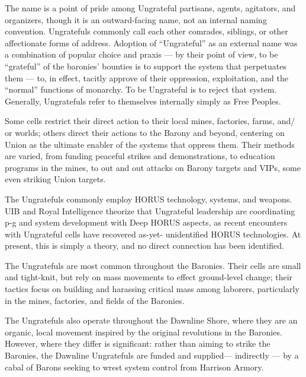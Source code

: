 The name is a point of pride among Ungrateful partisans, agents, agitators, and organizers,  
though it is an outward-facing name, not an internal naming convention. Ungratefuls commonly  
call each other comrades, siblings, or other affectionate forms of address. Adoption of  
“Ungrateful” as an external name was a combination of popular choice and praxis — by their  
point of view, to be “grateful” of the baronies’ bounties is to support the system that perpetuates  
them — to, in effect, tacitly approve of their oppression, exploitation, and the “normal” functions  
of monarchy. To be Ungrateful is to reject that system. Generally, Ungratefuls refer to themselves  
internally simply as Free Peoples. 
 

Some cells restrict their direct action to their local mines, factories, farms, and/ or worlds; others  
direct their actions to the Barony and beyond, centering on Union as the ultimate enabler of the  
systems that oppress them. Their methods are varied, from funding peaceful strikes and  
demonstrations, to education programs in the mines, to out and out attacks on Barony targets  
and VIPs, some even striking Union targets. 
 

                                                                                                          


The Ungratefuls commonly employ HORUS technology, systems, and weapons. UIB and Royal  
Intelligence theorize that Ungrateful leadership are coordinating p-g and system development  
with Deep HORUS aspects, as recent encounters with Ungrateful cells have recovered as-yet- 
unidentified HORUS technologies. At present, this is simply a theory, and no direct connection  
has been identified.  
 

The Ungratefuls are most common throughout the Baronies. Their cells are small and tight-knit,  
but rely on mass movements to effect ground-level change; their tactics focus on building and  
harassing critical mass among laborers, particularly in the mines, factories, and fields of the  
Baronies. 
 

The Ungratefuls also operate throughout the Dawnline Shore, where they are an organic, local  
movement inspired by the original revolutions in the Baronies. However, where they differ is  
significant: rather than aiming to strike the Baronies, the Dawnline Ungratefuls are funded and  
supplied— indirectly — by a cabal of Barons seeking to wrest system control from Harrison  
Armory. 
 

